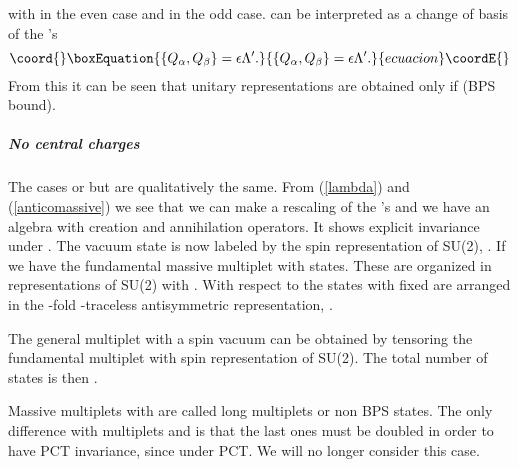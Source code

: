 \documentclass[a4paper,12pt]{article}
\begin{document}
with \coordHE{} in the even case and \coordHE{} in the odd case. \coordHE{} can be interpreted as a change
 of basis of the \coordHE{}'s
\begin{equation}\coord{}\boxEquation{\{Q_\alpha,Q_\beta\}=\epsilon\Lambda'.\label{anticomassive}
}{\{Q_\alpha,Q_\beta\}=\epsilon\Lambda'.}{ecuacion}\coordE{}\end{equation}
From this it can be seen that unitary representations are obtained
only if \coordHE{} (BPS bound).

\subparagraph{No central charges} The cases   \coordHE{} or \coordHE{} but  \coordHE{} are qualitatively the same.
 From (\ref{lambda}) and (\ref{anticomassive}) we see that we can make a rescaling of the \coordHE{}'s and
  we have an algebra with \coordHE{} creation and \coordHE{} annihilation operators. It shows explicit invariance
  under \coordHE{}. The vacuum state is now labeled by the spin representation of SU(2),
   \coordHE{}. If \coordHE{} we have the fundamental massive multiplet with \coordHE{} states. These
   are organized in  representations of SU(2) with \coordHE{}. With respect to \coordHE{} the states
   with fixed \coordHE{} are arranged in the \coordHE{}-fold \myHighlight{$\Omega$}\coordHE{}-traceless antisymmetric representation,
    \myHighlight{$[N-2J]$}\coordHE{}.

The general multiplet with a spin \coordHE{}  vacuum can  be obtained by tensoring the fundamental multiplet
 with spin \coordHE{} representation of SU(2). The total number of states is then \coordHE{}.

Massive multiplets with \coordHE{} are called long multiplets or non BPS states. The only difference with
multiplets \coordHE{} and \coordHE{} is that the last ones must be doubled in order to have PCT invariance,
since \coordHE{} under PCT. We will no longer  consider this case.
\end{document}
